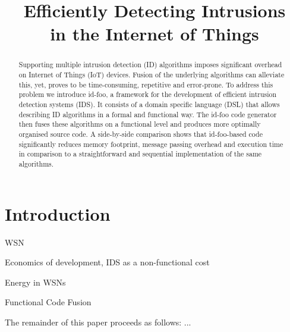 \documentclass[conference]{IEEEtran}
\begin{document}
\expandafter\def\csname PY@tok@err\endcsname{}

\title{Efficiently Detecting Intrusions\\in the Internet of Things}

\author{%
}

\maketitle

\begin{abstract}

Supporting multiple intrusion detection (ID) algorithms imposes significant
overhead on Internet of Things (IoT) devices. Fusion of the underlying
algorithms can alleviate this, yet, proves to be time-consuming, repetitive and
error-prone. To address this problem we introduce id-foo, a framework for the
development of efficient intrusion detection systems (IDS). It consists of a
domain specific language (DSL) that allows describing ID algorithms in a formal
and functional way. The id-foo code generator then fuses these algorithms on a
functional level and produces more optimally organised source code. A
side-by-side comparison shows that id-foo-based code significantly reduces
memory footprint, message passing overhead and execution time in comparison to
a straightforward and sequential implementation of the same algorithms.

\end{abstract}

\section{Introduction}

WSN \cite{baggio2005wireless,werner2005monitoring,hughes2006gridstix}

Economics of development, IDS as a non-functional cost \cite{lee2002toward}

Energy in WSNs \cite{hughes2013energy}

Functional Code Fusion

The remainder of this paper proceeds as follows: ...
\end{document}
